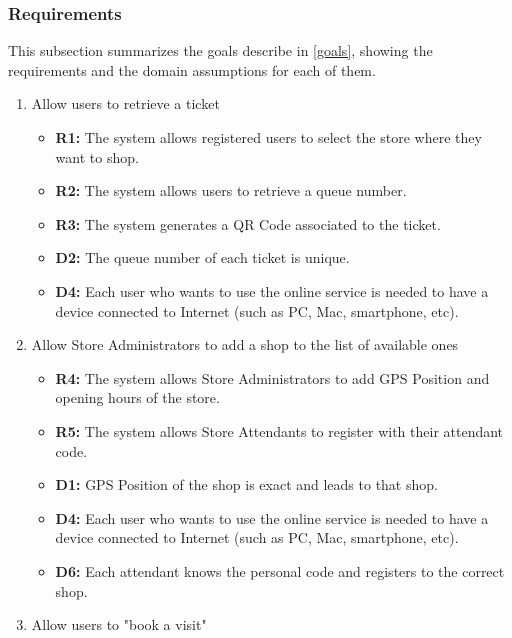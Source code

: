 \documentclass[table, 12pt]{article}
\begin{document}
\subsubsection{Requirements}
This subsection summarizes the goals describe in \ref{goals}, showing the requirements and the domain assumptions for each of them.


\begin{enumerate}[label=\textbf{-G\arabic*}:]
    \item {Allow users to retrieve a ticket
          \begin{itemize}
              \item \textbf{R1:} The system allows registered users to select the store where they want to shop.
              \item \textbf{R2:} The system allows users to retrieve a queue number.
              \item \textbf{R3:} The system generates a QR Code associated to the ticket.
              \item \textbf{D2:} The queue number of each ticket is unique.
              \item \textbf{D4:} Each user who wants to use the online service is needed to have a device connected to Internet (such as PC, Mac, smartphone, etc).
          \end{itemize}
          }
    \item {Allow Store Administrators to add a shop to the list of available ones
          \begin{itemize}
              \item\textbf{R4:} The system allows Store Administrators to add GPS Position and opening hours of the store.
              \item \textbf{R5:} The system allows Store Attendants to register with their attendant code.
              \item \textbf{D1:} GPS Position of the shop is exact and leads to that shop.
              \item \textbf{D4:} Each user who wants to use the online service is needed to have a device connected to Internet (such as PC, Mac, smartphone, etc).
              \item \textbf{D6:} Each attendant knows the personal code and registers to the correct shop.
          \end{itemize}
          }
    \item {Allow users to "book a visit"
          \begin{itemize}

\end{itemize}}
\end{enumerate}
\end{document}
